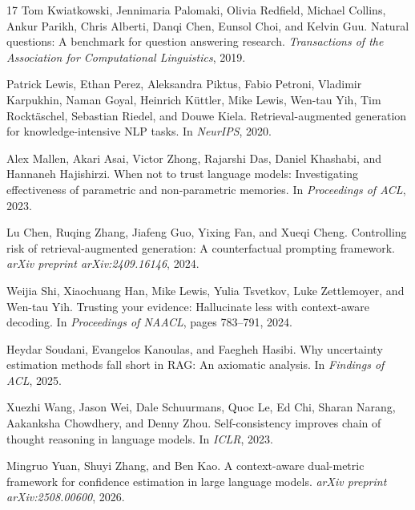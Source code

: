 \documentclass{article}
\begin{document}
\begin{thebibliography}{17}
Tom Kwiatkowski, Jennimaria Palomaki, Olivia Redfield, Michael Collins, Ankur Parikh, Chris Alberti, Danqi Chen, Eunsol Choi, and Kelvin Guu.
\newblock Natural questions: A benchmark for question answering research.
\newblock \emph{Transactions of the Association for Computational Linguistics}, 2019.

Patrick Lewis, Ethan Perez, Aleksandra Piktus, Fabio Petroni, Vladimir Karpukhin, Naman Goyal, Heinrich K{\"u}ttler, Mike Lewis, Wen-tau Yih, Tim Rockt{\"a}schel, Sebastian Riedel, and Douwe Kiela.
\newblock Retrieval-augmented generation for knowledge-intensive {NLP} tasks.
\newblock In \emph{NeurIPS}, 2020.

Alex Mallen, Akari Asai, Victor Zhong, Rajarshi Das, Daniel Khashabi, and Hannaneh Hajishirzi.
\newblock When not to trust language models: Investigating effectiveness of parametric and non-parametric memories.
\newblock In \emph{Proceedings of ACL}, 2023.

Lu Chen, Ruqing Zhang, Jiafeng Guo, Yixing Fan, and Xueqi Cheng.
\newblock Controlling risk of retrieval-augmented generation: A counterfactual prompting framework.
\newblock \emph{arXiv preprint arXiv:2409.16146}, 2024.

Weijia Shi, Xiaochuang Han, Mike Lewis, Yulia Tsvetkov, Luke Zettlemoyer, and Wen-tau Yih.
\newblock Trusting your evidence: Hallucinate less with context-aware decoding.
\newblock In \emph{Proceedings of NAACL}, pages 783--791, 2024.

Heydar Soudani, Evangelos Kanoulas, and Faegheh Hasibi.
\newblock Why uncertainty estimation methods fall short in {RAG}: An axiomatic analysis.
\newblock In \emph{Findings of ACL}, 2025.

Xuezhi Wang, Jason Wei, Dale Schuurmans, Quoc Le, Ed Chi, Sharan Narang, Aakanksha Chowdhery, and Denny Zhou.
\newblock Self-consistency improves chain of thought reasoning in language models.
\newblock In \emph{ICLR}, 2023.

Mingruo Yuan, Shuyi Zhang, and Ben Kao.
\newblock A context-aware dual-metric framework for confidence estimation in large language models.
\newblock \emph{arXiv preprint arXiv:2508.00600}, 2026.

\end{thebibliography}
\end{document}
